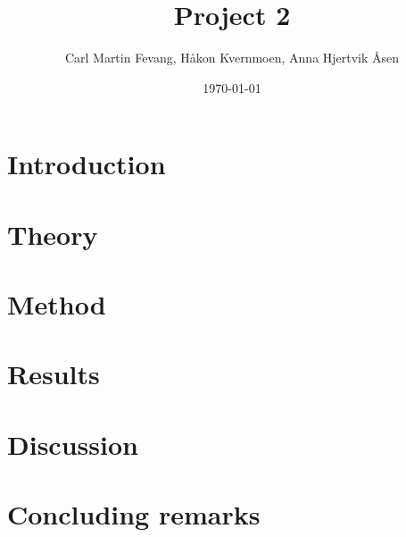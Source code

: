 \documentclass[twocolumn,english,notitlepage]{article}
\title{Project 2}
\author{Carl Martin Fevang, Håkon Kvernmoen, Anna Hjertvik Åsen}
\date{\today}
\begin{document}


\section{Introduction}


\section{Theory}


\section{Method}


\section{Results}


\section{Discussion}


\section{Concluding remarks}


\renewcommand{\theequation}{\thesection.\arabic{equation}}
\begin{appendices}
     
\end{appendices}

\printbibliography
\end{document}
